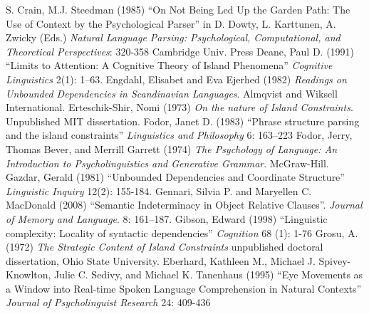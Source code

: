 \documentclass[a4paper]{article}
\begin{document}
\newline
\newline
S. Crain, M.J. Steedman (1985)
``On Not Being Led Up the Garden Path: The Use of Context by the Psychological Parser'' in
D. Dowty, L. Karttunen, A. Zwicky (Eds.) {\it Natural Language Parsing: Psychological, Computational, and Theoretical Perspectives}: 320-358 Cambridge Univ. Press
\newline
\newline
Deane, Paul D. (1991) ``Limits to Attention: A Cognitive Theory
of Island Phenomena''
{\it Cognitive
Linguistics}
2(1): 1–63.
\newline
\newline
Engdahl, Elisabet and Eva Ejerhed (1982) {\it Readings on Unbounded Dependencies in Scandinavian Languages}.  Almqvist and Wiksell International.
\newline
\newline
Erteschik-Shir, Nomi (1973) {\it On the nature of Island Constraints}.  Unpublished MIT dissertation.
\newline
\newline
Fodor, Janet D. (1983) ``Phrase structure parsing and the island constraints''
{\it Linguistics and
Philosophy}
6: 163–223
\newline
\newline
Fodor, Jerry, Thomas Bever, and Merrill Garrett (1974) {\it The Psychology of Language: An Introduction to Psycholinguistics and Generative Grammar}.  McGraw-Hill.
\newline
\newline
Gazdar, Gerald (1981) ``Unbounded Dependencies and Coordinate Structure'' {\it Linguistic Inquiry} 12(2): 155-184.
\newline
\newline
Gennari, Silvia P. and Maryellen C. MacDonald (2008) ``Semantic Indeterminacy in Object Relative Clauses''.  {\it Journal of Memory and Language}.  8: 161–187.
\newline
\newline
Gibson, Edward (1998)
``Linguistic complexity: Locality of syntactic dependencies''
{\it Cognition} 68 (1): 1-76
\newline
\newline
 Grosu, A. (1972) {\it The Strategic Content of Island Constraints}
 unpublished doctoral dissertation, Ohio State University.
\newline
\newline
Eberhard, Kathleen M., Michael J. Spivey-Knowlton, Julie C. Sedivy, and Michael K. Tanenhaus (1995) ``Eye Movements as a Window into Real-time Spoken Language Comprehension in Natural Contexts'' {\it Journal of Psycholinguist Research} 24: 409-436
\end{document}

